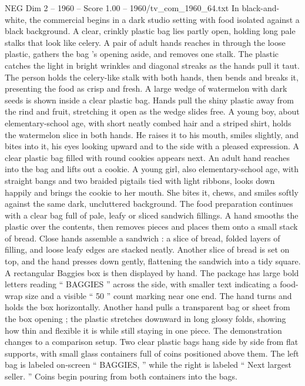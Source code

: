 \begin{textsample}{NEG Dim 2 – 1960 – Score 1.00 – 1960/tv\_com\_1960\_64.txt}  \label{ex:f2_neg_086}
In black-and-white, the commercial begins in a dark studio setting with food isolated against a black background.
A clear, crinkly plastic bag lies partly open, holding long pale stalks that look like celery.
A pair of adult hands reaches in through the loose plastic, gathers the bag ’s opening aside, and removes one stalk.
The plastic catches the light in bright wrinkles and diagonal streaks as the hands pull it taut.
The person holds the celery-like stalk with both hands, then bends and breaks it, presenting the food as crisp and fresh.
A large wedge of watermelon with dark seeds is shown inside a clear plastic bag.
Hands pull the shiny plastic away from the rind and fruit, stretching it open as the wedge slides free.
A young boy, about elementary-school age, with short neatly combed hair and a striped shirt, holds the watermelon slice in both hands.
He raises it to his mouth, smiles slightly, and bites into it, his eyes looking upward and to the side with a pleased expression.
A clear plastic bag filled with round cookies appears next.
An adult hand reaches into the bag and lifts out a cookie.
A young girl, also elementary-school age, with straight bangs and two braided pigtails tied with light ribbons, looks down happily and brings the cookie to her mouth.
She bites it, chews, and smiles softly against the same dark, uncluttered background.
The food preparation continues with a clear bag full of pale, leafy or sliced sandwich fillings.
A hand smooths the plastic over the contents, then removes pieces and places them onto a small stack of bread.
Close hands assemble a sandwich : a slice of bread, folded layers of filling, and loose leafy edges are stacked neatly.
Another slice of bread is set on top, and the hand presses down gently, flattening the sandwich into a tidy square.
A rectangular Baggies box is then displayed by hand.
The package has large bold letters reading “ BAGGIES ” across the side, with smaller text indicating a food-wrap size and a visible “ 50 ” count marking near one end.
The hand turns and holds the box horizontally.
Another hand pulls a transparent bag or sheet from the box opening ; the plastic stretches downward in long glossy folds, showing how thin and flexible it is while still staying in one piece.
The demonstration changes to a comparison setup.
Two clear plastic bags hang side by side from flat supports, with small glass containers full of coins positioned above them.
The left bag is labeled on-screen “ BAGGIES, ” while the right is labeled “ Next largest seller. ” Coins begin pouring from both containers into the bags.

\end{textsample}
